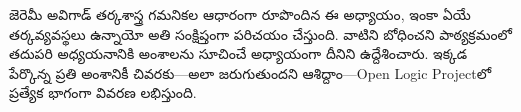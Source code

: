 \documentclass[../../../include/open-logic-chapter]{subfiles}
\begin{document}

\begin{editorial}
  జెరెమీ అవిగాడ్ తర్కశాస్త్ర గమనికల ఆధారంగా రూపొందిన ఈ అధ్యాయం, ఇంకా
  ఏయే తర్కవ్యవస్థలు ఉన్నాయో అతి సంక్షిప్తంగా పరిచయం చేస్తుంది. వాటిని
  బోధించని పాఠ్యక్రమంలో తదుపరి అధ్యయనానికి అంశాలను సూచించే అధ్యాయంగా
  దీనిని ఉద్దేశించారు. ఇక్కడ పేర్కొన్న ప్రతి అంశానికీ చివరకు---అలా
  జరుగుతుందని ఆశిద్దాం---Open Logic Projectలో ప్రత్యేక భాగంగా
  వివరణ లభిస్తుంది.
\end{editorial}








\OLEndChapterHook
\end{document}
